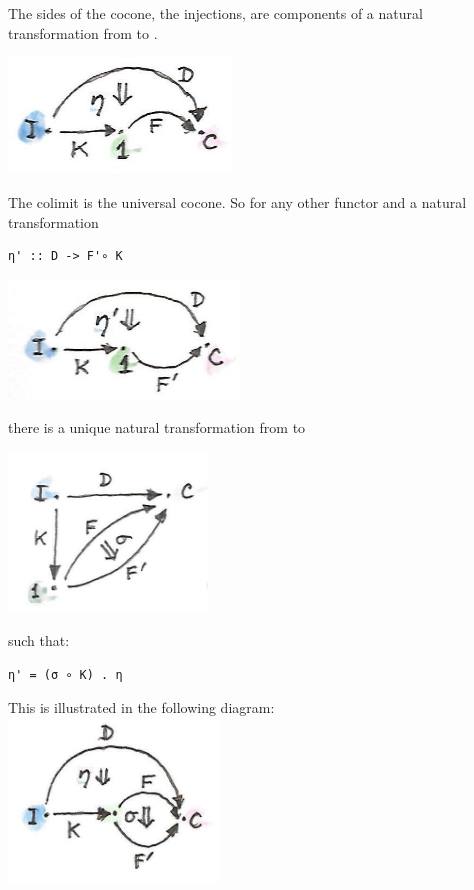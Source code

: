 The sides of the cocone, the injections, are components of a natural
transformation  from  to .

\includegraphics[width=2.33333in]{images/kan10a.jpg}

The colimit is the universal cocone. So for any other functor
 and a natural transformation

\begin{verbatim}
η' :: D -> F'∘ K
\end{verbatim}

\includegraphics[width=2.40625in]{images/kan10b.jpg}

there is a unique natural transformation  from  to

\includegraphics[width=2.08333in]{images/kan14.jpg}

such that:

\begin{verbatim}
η' = (σ ∘ K) . η
\end{verbatim}

This is illustrated in the following diagram:\\
\includegraphics[width=2.19792in]{images/kan112.jpg}

